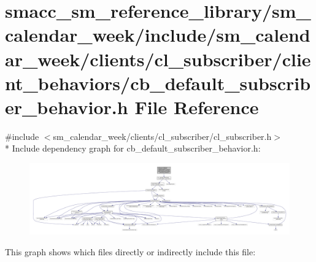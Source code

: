 \hypertarget{sm__calendar__week_2include_2sm__calendar__week_2clients_2cl__subscriber_2client__behaviors_2cb_2dd2f4ccb4741b9c6659a707c9fdb5ee}{}\section{smacc\+\_\+sm\+\_\+reference\+\_\+library/sm\+\_\+calendar\+\_\+week/include/sm\+\_\+calendar\+\_\+week/clients/cl\+\_\+subscriber/client\+\_\+behaviors/cb\+\_\+default\+\_\+subscriber\+\_\+behavior.h File Reference}
\label{sm__calendar__week_2include_2sm__calendar__week_2clients_2cl__subscriber_2client__behaviors_2cb_2dd2f4ccb4741b9c6659a707c9fdb5ee}
{\ttfamily \#include $<$sm\+\_\+calendar\+\_\+week/clients/cl\+\_\+subscriber/cl\+\_\+subscriber.\+h$>$}\\*
Include dependency graph for cb\+\_\+default\+\_\+subscriber\+\_\+behavior.\+h\+:
\nopagebreak
\begin{figure}[H]
\begin{center}
\leavevmode
\includegraphics[width=350pt]{sm__calendar__week_2include_2sm__calendar__week_2clients_2cl__subscriber_2client__behaviors_2cb_822af4dd36e2c5c4dcfbde5b77fe30ff}
\end{center}
\end{figure}
This graph shows which files directly or indirectly include this file\+:
\nopagebreak
